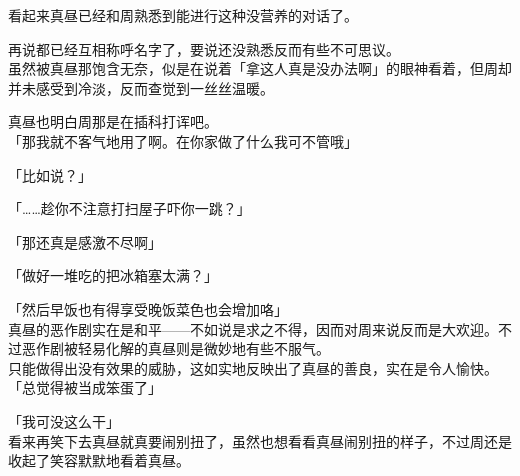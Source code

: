 看起来真昼已经和周熟悉到能进行这种没营养的对话了。

再说都已经互相称呼名字了，要说还没熟悉反而有些不可思议。\\

虽然被真昼那饱含无奈，似是在说着「拿这人真是没办法啊」的眼神看着，但周却并未感受到冷淡，反而查觉到一丝丝温暖。

真昼也明白周那是在插科打诨吧。\\

「那我就不客气地用了啊。在你家做了什么我可不管哦」

「比如说？」

「……趁你不注意打扫屋子吓你一跳？」

「那还真是感激不尽啊」

「做好一堆吃的把冰箱塞太满？」

「然后早饭也有得享受晚饭菜色也会增加咯」\\

真昼的恶作剧实在是和平——不如说是求之不得，因而对周来说反而是大欢迎。不过恶作剧被轻易化解的真昼则是微妙地有些不服气。\\

只能做得出没有效果的威胁，这如实地反映出了真昼的善良，实在是令人愉快。\\

「总觉得被当成笨蛋了」

「我可没这么干」\\

看来再笑下去真昼就真要闹别扭了，虽然也想看看真昼闹别扭的样子，不过周还是收起了笑容默默地看着真昼。
